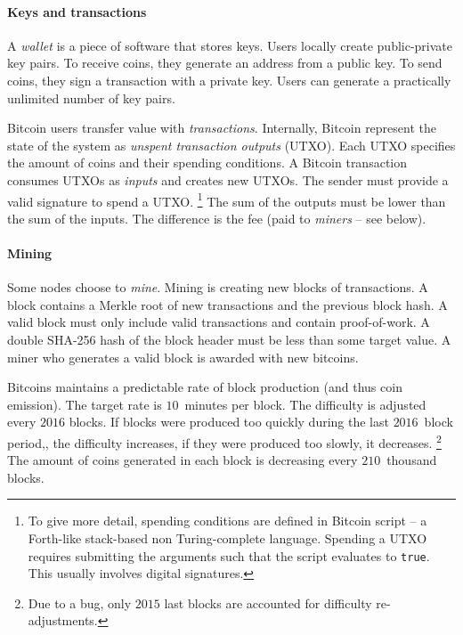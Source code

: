 \paragraph{Keys and transactions}

A \textit{wallet} is a piece of software that stores keys.
Users locally create public-private key pairs.
To receive coins, they generate an address from a public key.
To send coins, they sign a transaction with a private key.
Users can generate a practically unlimited number of key pairs.

Bitcoin users transfer value with \textit{transactions}.
Internally, Bitcoin represent the state of the system as \textit{unspent transaction outputs} (UTXO).
Each UTXO specifies the amount of coins and their spending conditions.
A Bitcoin transaction consumes UTXOs as \textit{inputs} and creates new UTXOs.
The sender must provide a valid signature to spend a UTXO.
\footnote{To give more detail, spending conditions are defined in Bitcoin script -- a Forth-like stack-based non Turing-complete language.
Spending a UTXO requires submitting the arguments such that the script evaluates to \texttt{true}.
This usually involves digital signatures.}
The sum of the outputs must be lower than the sum of the inputs.
The difference is the fee (paid to \textit{miners} -- see below).


\paragraph{Mining}

Some nodes choose to \textit{mine}.
Mining is creating new blocks of transactions.
A block contains a Merkle root of new transactions and the previous block hash.
A valid block must only include valid transactions and contain proof-of-work.
A double SHA-256 hash of the block header must be less than some target value.
A miner who generates a valid block is awarded with new bitcoins.

Bitcoins maintains a predictable rate of block production (and thus coin emission).
The target rate is $10$~minutes per block.
The difficulty is adjusted every $2016$ blocks.
If blocks were produced too quickly during the last $2016$~block period,, the difficulty increases, if they were produced too slowly, it decreases.
\footnote{Due to a bug, only $2015$ last blocks are accounted for difficulty re-adjustments.}
The amount of coins generated in each block is decreasing every $210$~thousand blocks.


